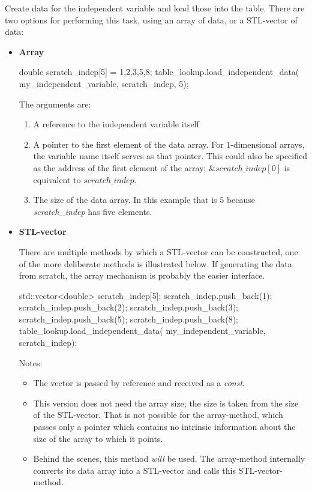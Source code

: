 \documentclass[11pt,fleqn]{report}
\begin{document}
Create data for the independent variable and load those into the table.
There are two options for performing this task, using an array of data, or a
 STL-vector of data:
\begin{itemize}

 \item \textbf{Array}

\begin{code}
double scratch_indep[5] = {1,2,3,5,8};
table_lookup.load_independent_data( my_independent_variable,
                                    scratch_indep,
                                    5);
\end{code}

The arguments are:
\begin{enumerate}
 \item A reference to the independent variable itself
 \item A pointer to the first element of the data array.
  For 1-dimensional arrays, the variable name itself serves as that pointer.
  This could also be specified as the address of the first element of the
  array; $\&scratch\_indep[0]$ is equivalent to $scratch\_indep$.
 \item The size of the data array.  In this example that is $5$
 because \textit{scratch\_indep} has five elements.
\end{enumerate}


 \item \textbf{STL-vector}

There are multiple methods by which a STL-vector can be constructed,
 one of the more deliberate methods is illustrated below.
 If generating the data from scratch, the array mechanism is probably the
 easier interface.

\begin{code}
std::vector<double> scratch_indep[5];
scratch_indep.push_back(1);
scratch_indep.push_back(2);
scratch_indep.push_back(3);
scratch_indep.push_back(5);
scratch_indep.push_back(8);
table_lookup.load_independent_data( my_independent_variable,
                                    scratch_indep);

\end{code}
Notes:
\begin{itemize}
 \item The vector is passed by reference and received as a \textit{const}.
 \item This version does not need the array size; the size is taken
 from the size of the STL-vector.
  That is not possible for the array-method, which passes only a pointer
 which contains no intrinsic information about the size of the array to
 which it points.
 \item Behind the scenes, this method \textit{will} be used.
 The array-method internally converts its data array into a STL-vector and
 calls this STL-vector-method.
\end{itemize}


\end{itemize}
\end{document}
